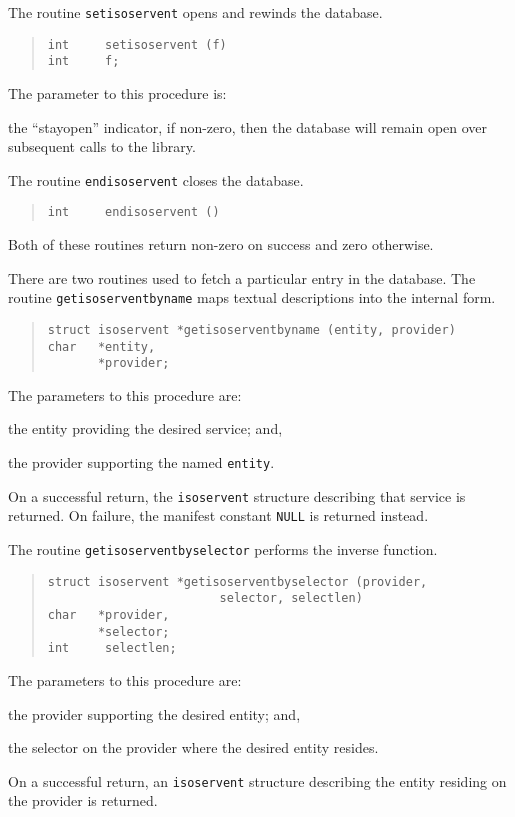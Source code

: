The routine \verb"setisoservent" opens and rewinds the database.
\begin{quote}\small\begin{verbatim}
int     setisoservent (f)
int     f;
\end{verbatim}\end{quote}
The parameter to this procedure is:
\begin{describe}
\item[\verb"f":] the ``stayopen'' indicator,
if non-zero, then the database will remain open over subsequent calls to the
library.
\end{describe}
The routine \verb"endisoservent" closes the database.
\begin{quote}\small\begin{verbatim}
int     endisoservent ()
\end{verbatim}\end{quote}
Both of these routines return non-zero on success and zero otherwise.

There are two routines used to fetch a particular entry in the database.
The routine \verb"getisoserventbyname" maps textual descriptions into the
internal form.
\begin{quote}\small\begin{verbatim}
struct isoservent *getisoserventbyname (entity, provider)
char   *entity,
       *provider;
\end{verbatim}\end{quote}
The parameters to this procedure are:
\begin{describe}
\item[\verb"entity":] the entity providing the desired service;
and,

\item[\verb"provider":] the provider supporting the named \verb"entity".
\end{describe}
On a successful return,
the \verb"isoservent" structure describing that service is returned.
On failure, the manifest constant \verb"NULL" is returned instead.

The routine \verb"getisoserventbyselector" performs the inverse function.
\begin{quote}\small\begin{verbatim}
struct isoservent *getisoserventbyselector (provider,
                        selector, selectlen)
char   *provider,
       *selector;
int     selectlen;
\end{verbatim}\end{quote}
The parameters to this procedure are:
\begin{describe}
\item[\verb"provider":] the provider supporting the desired entity;
and,

\item[\verb"selector"/\verb"selectlen":] the selector on the provider
where the desired entity resides.
\end{describe}
On a successful return,
an \verb"isoservent" structure describing the entity residing on the provider
is returned.

